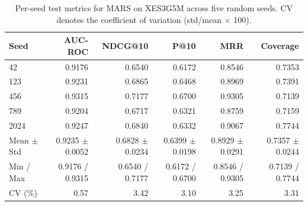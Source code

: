 \begin{table}[t]
\centering
\caption{Per-seed test metrics for MARS on XES3G5M across five random seeds. CV denotes the coefficient of variation (std/mean $\times$ 100).}
\label{tab:seed_stability_full}
\begin{tabular}{lrrrrr}
\toprule
Seed & AUC-ROC & NDCG@10 & P@10 & MRR & Coverage \\
\midrule
42 & 0.9176 & 0.6540 & 0.6172 & 0.8546 & 0.7353 \\
123 & 0.9231 & 0.6865 & 0.6468 & 0.8969 & 0.7391 \\
456 & 0.9315 & 0.7177 & 0.6700 & 0.9305 & 0.7139 \\
789 & 0.9204 & 0.6717 & 0.6321 & 0.8759 & 0.7159 \\
2024 & 0.9247 & 0.6840 & 0.6332 & 0.9067 & 0.7744 \\
\midrule
Mean $\pm$ Std & 0.9235 $\pm$ 0.0052 & 0.6828 $\pm$ 0.0234 & 0.6399 $\pm$ 0.0198 & 0.8929 $\pm$ 0.0291 & 0.7357 $\pm$ 0.0244 \\
Min / Max & 0.9176 / 0.9315 & 0.6540 / 0.7177 & 0.6172 / 0.6700 & 0.8546 / 0.9305 & 0.7139 / 0.7744 \\
CV (\%) & 0.57 & 3.42 & 3.10 & 3.25 & 3.31 \\
\bottomrule
\end{tabular}
\end{table}
